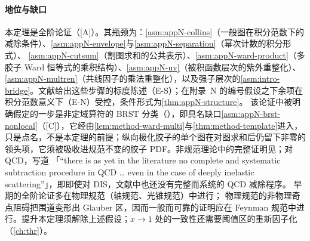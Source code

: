 \paragraph{地位与缺口}
本定理是全阶论证（[A]）。其瓶颈为：\cref{asm:appN-collins}（一般图在积分范数下的减除条件）、\cref{asm:appN-envelope}与\cref{asm:appN-separation}（幂次计数的积分形式）、
\cref{asm:appN-cutsum}（割图求和的公共表示）、\cref{asm:appN-ward-product}（多胶子 Ward 恒等式的乘积结构）、\cref{asm:appN-uv}（被积函数层次的紫外重整化）、
\cref{asm:appN-multren}（共线因子的乘法重整化），以及强子层次的\cref{asm:intro-bridge}。文献给出这些步骤的标度陈述（E-S）；在附录~N 的编号假设之下余项在积分范数意义下（E-N）受控，条件形式为\cref{thm:appN-structure}。
该论证中被明确假定的一步是非定域算符的 BRST 分类（\cite[第~11.3.2~节，第~407--410~页]{Collins2011}），即具名缺口\cref{asm:appN-brst-nonlocal}（[C]），它经由\cref{lem:method-ward-multi}与\cref{thm:method-template}进入，
只是点名，不是本定理的前提；纵向极化胶子的单个图在对图求和后仍留下非零的领头项，它须被吸收进规范不变的胶子 PDF\cite{Collins:2008sg}。非规范理论中的完整证明见\cite[第~8.9~节]{Collins2011}；对 QCD，\cite[第~10.1~节]{CollinsSoperSterman1989}写道
「“there is as yet in the literature no complete and systematic subtraction procedure in QCD \ldots{} even in the case of deeply inelastic scattering”」，即即使对 DIS，文献中也还没有完整而系统的 QCD 减除程序。
早期的全阶论证\cite{EllisEtAl1979,Ellis:1978sf,AmatiPetronzioVeneziano1978a,AmatiPetronzioVeneziano1978b,Mueller1978,CurciFurmanskiPetronzio1980}多在物理规范（轴规范、光锥规范）中进行；
物理规范的非物理奇点阻碍把围道变形出 Glauber 区，因而一般而可靠的证明应在 Feynman 规范中进行\cite[第~12.6~节]{Collins2011}。提升本定理须解除上述假设；$x\to1$ 处的一致性还需要阈值区的重新因子化（\cref{ch:thr}）。
